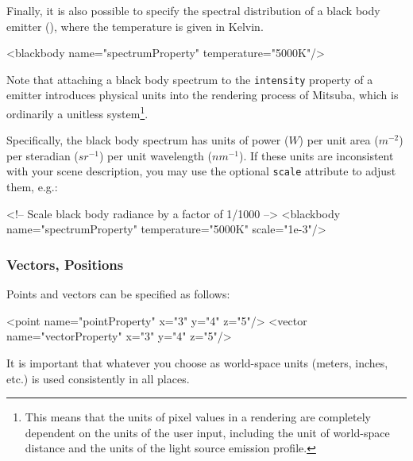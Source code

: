 \label{sec:blackbody}
Finally, it is also possible to specify the spectral distribution of a black body emitter (),
where the temperature is given in Kelvin.
\begin{xml}
<blackbody name="spectrumProperty" temperature="5000K"/>
\end{xml}
Note that attaching a black body spectrum to the \texttt{intensity} property
of a emitter introduces physical units into the rendering process of
Mitsuba, which is ordinarily a unitless system\footnote{This means that the
units of pixel values in a rendering are completely dependent on the units of
the user input, including the unit of world-space distance and the units of
the light source emission profile.}.

Specifically, the black body spectrum has units of power ($W$) per
unit area ($m^{-2}$) per steradian ($sr^{-1}$) per unit wavelength ($nm^{-1}$).
If these units are inconsistent with your scene description, you may use the
optional \texttt{scale} attribute to adjust them, e.g.:
\begin{xml}
<!-- Scale black body radiance by a factor of 1/1000 -->
<blackbody name="spectrumProperty" temperature="5000K" scale="1e-3"/>
\end{xml}

\subsubsection{Vectors, Positions}
Points and vectors can be specified as follows:
\begin{xml}
<point name="pointProperty" x="3" y="4" z="5"/>
<vector name="vectorProperty" x="3" y="4" z="5"/>
\end{xml}
It is important that whatever you choose as world-space units (meters, inches, etc.) is
used consistently in all places.
